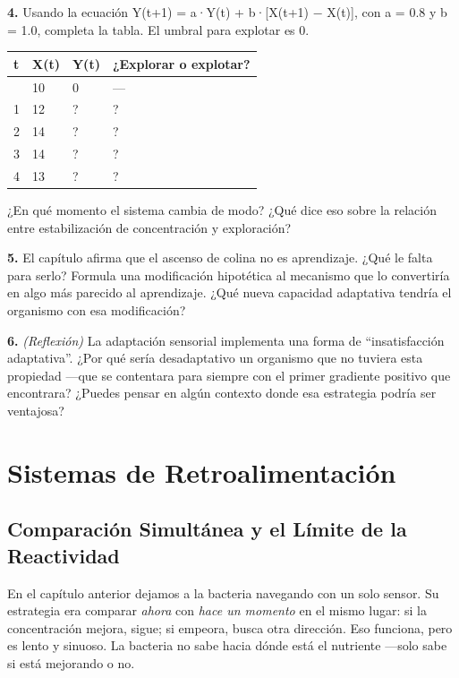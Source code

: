 \documentclass[
  letterpaper,
  DIV=11,
  numbers=noendperiod]{scrreprt}
\newcounter{none} %
\begin{document}
\textbf{4.} Usando la ecuación Y(t+1) = a·Y(t) + b·{[}X(t+1) − X(t){]},
con a = 0.8 y b = 1.0, completa la tabla. El umbral para explotar es 0.

{\def\LTcaptype{none} %
\begin{longtable}[]{@{}llll@{}}
\toprule\noalign{}
t & X(t) & Y(t) & ¿Explorar o explotar? \\
\midrule\noalign{}
\endhead
\bottomrule\noalign{}
\endlastfoot
0 & 10 & 0 & --- \\
1 & 12 & ? & ? \\
2 & 14 & ? & ? \\
3 & 14 & ? & ? \\
4 & 13 & ? & ? \\
\end{longtable}
}

¿En qué momento el sistema cambia de modo? ¿Qué dice eso sobre la
relación entre estabilización de concentración y exploración?

\textbf{5.} El capítulo afirma que el ascenso de colina no es
aprendizaje. ¿Qué le falta para serlo? Formula una modificación
hipotética al mecanismo que lo convertiría en algo más parecido al
aprendizaje. ¿Qué nueva capacidad adaptativa tendría el organismo con
esa modificación?

\textbf{6.} \emph{(Reflexión)} La adaptación sensorial implementa una
forma de ``insatisfacción adaptativa''. ¿Por qué sería desadaptativo un
organismo que no tuviera esta propiedad ---que se contentara para
siempre con el primer gradiente positivo que encontrara? ¿Puedes pensar
en algún contexto donde esa estrategia podría ser ventajosa?


\chapter{Sistemas de
Retroalimentación}\label{sistemas-de-retroalimentaciuxf3n}

\section{Comparación Simultánea y el Límite de la
Reactividad}\label{comparaciuxf3n-simultuxe1nea-y-el-luxedmite-de-la-reactividad}

En el capítulo anterior dejamos a la bacteria navegando con un solo
sensor. Su estrategia era comparar \emph{ahora} con \emph{hace un
momento} en el mismo lugar: si la concentración mejora, sigue; si
empeora, busca otra dirección. Eso funciona, pero es lento y sinuoso. La
bacteria no sabe hacia dónde está el nutriente ---solo sabe si está
mejorando o no.
\end{document}
